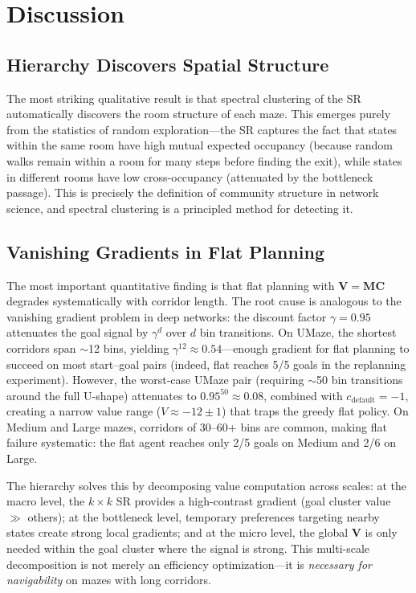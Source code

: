 \documentclass[11pt,a4paper]{article}
\newcommand{\M}{\mathbf{M}}
\newcommand{\C}{\mathbf{C}}
\newcommand{\V}{\mathbf{V}}
\begin{document}
\section{Discussion}
\label{sec:discussion}

\subsection{Hierarchy Discovers Spatial Structure}

The most striking qualitative result is that spectral clustering of the SR automatically discovers the room structure of each maze.
This emerges purely from the statistics of random exploration---the SR captures the fact that states within the same room have high mutual expected occupancy (because random walks remain within a room for many steps before finding the exit), while states in different rooms have low cross-occupancy (attenuated by the bottleneck passage).
This is precisely the definition of community structure in network science, and spectral clustering is a principled method for detecting it.

\subsection{Vanishing Gradients in Flat Planning}

The most important quantitative finding is that flat planning with $\V = \M\C$ degrades systematically with corridor length.
The root cause is analogous to the vanishing gradient problem in deep networks: the discount factor $\gamma = 0.95$ attenuates the goal signal by $\gamma^d$ over $d$ bin transitions.
On UMaze, the shortest corridors span $\sim$12 bins, yielding $\gamma^{12} \approx 0.54$---enough gradient for flat planning to succeed on most start--goal pairs (indeed, flat reaches 5/5 goals in the replanning experiment).
However, the worst-case UMaze pair (requiring $\sim$50 bin transitions around the full U-shape) attenuates to $0.95^{50} \approx 0.08$, combined with $c_{\text{default}} = -1$, creating a narrow value range ($V \approx -12 \pm 1$) that traps the greedy flat policy.
On Medium and Large mazes, corridors of 30--60+ bins are common, making flat failure systematic: the flat agent reaches only 2/5 goals on Medium and 2/6 on Large.

The hierarchy solves this by decomposing value computation across scales:
at the macro level, the $k \times k$ SR provides a high-contrast gradient (goal cluster value $\gg$ others); at the bottleneck level, temporary preferences targeting nearby states create strong local gradients; and at the micro level, the global $\V$ is only needed within the goal cluster where the signal is strong.
This multi-scale decomposition is not merely an efficiency optimization---it is \emph{necessary for navigability} on mazes with long corridors.
\end{document}
